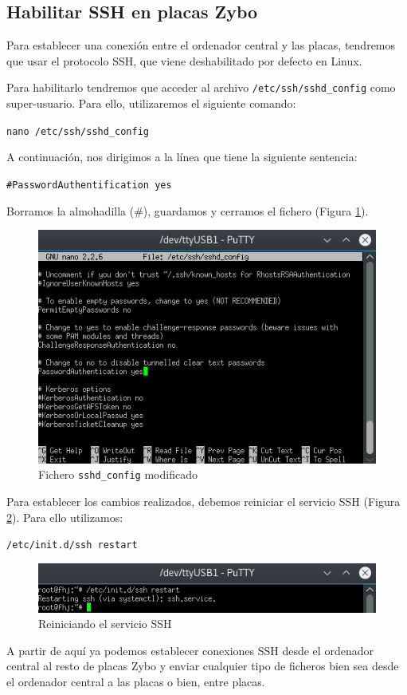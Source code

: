 \subsection{Habilitar SSH en placas Zybo}
Para establecer una conexión entre el ordenador central y las placas, tendremos que usar el protocolo SSH, que viene deshabilitado por defecto en Linux.

Para habilitarlo tendremos que acceder al archivo \texttt{/etc/ssh/sshd\_config} como super-usuario. Para ello, utilizaremos el siguiente comando:
\begin{center}
	\texttt{nano /etc/ssh/sshd\_config}
\end{center}
A continuación, nos dirigimos a la línea que tiene la siguiente sentencia:
\begin{center}
	\texttt{\#PasswordAuthentification yes}
\end{center}
Borramos la almohadilla (\#), guardamos y cerramos el fichero (Figura \ref{Fichero ssh_d modificado}).
\begin{figure}[h]
	\centering
	\includegraphics[scale=0.8]{Anexos/Anexo2/Linux/SSH.png}
	\caption{Fichero \texttt{sshd\_config} modificado}
	\label{Fichero ssh_d modificado}
\end{figure}

\newpage
Para establecer los cambios realizados, debemos reiniciar el servicio SSH (Figura \ref{Reiniciando el servicio SSH}). Para ello utilizamos:
\begin{center}
	\texttt{/etc/init.d/ssh restart}
\end{center}
\begin{figure}[h]
	\centering
	\includegraphics[scale=0.8]{Anexos/Anexo2/Linux/SSHRestart.png}
	\caption{Reiniciando el servicio SSH}
	\label{Reiniciando el servicio SSH}
\end{figure}

A partir de aquí ya podemos establecer conexiones SSH desde el ordenador central al resto de placas Zybo y enviar cualquier tipo de ficheros bien sea desde el ordenador central a las placas o bien, entre placas.